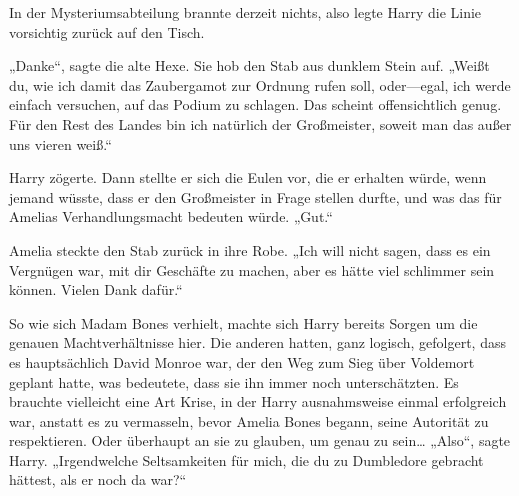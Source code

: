 In der Mysteriumsabteilung brannte derzeit nichts, also legte Harry die Linie vorsichtig zurück auf den Tisch.

„Danke“, sagte die alte Hexe. Sie hob den Stab aus dunklem Stein auf. „Weißt du, wie ich damit das Zaubergamot zur Ordnung rufen soll, oder—egal, ich werde einfach versuchen, auf das Podium zu schlagen. Das scheint offensichtlich genug. Für den Rest des Landes bin ich natürlich der Großmeister, soweit man das außer uns vieren weiß.“

Harry zögerte. Dann stellte er sich die Eulen vor, die er erhalten würde, wenn jemand wüsste, dass er den Großmeister in Frage stellen durfte, und was das für Amelias Verhandlungsmacht bedeuten würde.
„Gut.“

Amelia steckte den Stab zurück in ihre Robe.
„Ich will nicht sagen, dass es ein Vergnügen war, mit dir Geschäfte zu machen, aber es hätte viel schlimmer sein können. Vielen Dank dafür.“

So wie sich Madam Bones verhielt, machte sich Harry bereits Sorgen um die genauen Machtverhältnisse hier. Die anderen hatten, ganz logisch, gefolgert, dass es hauptsächlich David Monroe war, der den Weg zum Sieg über Voldemort geplant hatte, was bedeutete, dass sie ihn immer noch unterschätzten. Es brauchte vielleicht eine Art Krise, in der Harry ausnahmsweise einmal erfolgreich war, anstatt es zu vermasseln, bevor Amelia Bones begann, seine Autorität zu respektieren. Oder überhaupt an sie zu glauben, um genau zu sein…
„Also“, sagte Harry. „Irgendwelche Seltsamkeiten für mich, die du zu Dumbledore gebracht hättest, als er noch da war?“

